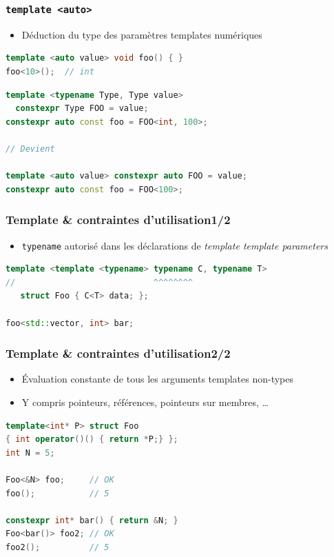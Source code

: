 \documentclass[C++.tex]{subfiles}
\begin{document}
\begin{frame}[fragile]
	\frametitle{\lstinline|template <auto>|}
	\begin{itemize}
		\item Déduction du type des paramètres templates numériques
	\end{itemize}

	\begin{lstlisting}[language=C++]
template <auto value> void foo() { }
foo<10>();  // int\end{lstlisting}

	\begin{lstlisting}[language=C++]
template <typename Type, Type value> 
  constexpr Type FOO = value;
constexpr auto const foo = FOO<int, 100>;

// Devient

template <auto value> constexpr auto FOO = value;
constexpr auto const foo = FOO<100>;
\end{lstlisting}

\end{frame}

\begin{frame}[fragile]
	\frametitle{Template \& contraintes d'utilisation\titlehfill{}1/2}
	\begin{itemize}
		\item \lstinline|typename| autorisé dans les déclarations de \textit{template template parameters}
	\end{itemize}

	\begin{lstlisting}[language=C++]
template <template <typename> typename C, typename T>
//                            ^^^^^^^^
   struct Foo { C<T> data; };

foo<std::vector, int> bar;\end{lstlisting}

\end{frame}

\begin{frame}[fragile]
	\frametitle{Template \& contraintes d'utilisation\titlehfill{}2/2}
	\begin{itemize}
		\item Évaluation constante de tous les arguments templates \og non-types\fg{}
		\item Y compris pointeurs, références, pointeurs sur membres, \ldots
	\end{itemize}

	\begin{lstlisting}[language=C++]
template<int* P> struct Foo
{ int operator()() { return *P;} };
int N = 5;

Foo<&N> foo;     // OK
foo();           // 5

constexpr int* bar() { return &N; }
Foo<bar()> foo2; // OK
foo2();          // 5\end{lstlisting}
\end{frame}
\end{document}
